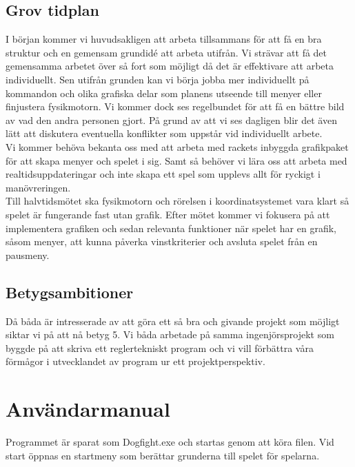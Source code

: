 \documentclass[12pt,a4paper]{article}
\begin{document}
\subsection{Grov tidplan}
I början kommer vi huvudsakligen att arbeta tillsammans för att få en bra struktur och en gemensam grundidé att arbeta utifrån. Vi strävar att få det gemensamma arbetet över så fort som möjligt då det är effektivare att arbeta individuellt. Sen utifrån grunden kan vi börja jobba mer individuellt på kommandon och olika grafiska delar som planens utseende till menyer eller finjustera fysikmotorn. Vi kommer dock ses regelbundet för att få en bättre bild av vad den andra personen gjort. På grund av att vi ses dagligen blir det även lätt att diskutera eventuella konflikter som uppstår vid individuellt arbete. \\

Vi kommer behöva bekanta oss med att arbeta med rackets inbyggda grafikpaket för att skapa menyer och spelet i sig. Samt så behöver vi lära oss att arbeta med realtidsuppdateringar och inte skapa ett spel som upplevs allt för ryckigt i manövreringen. \\

Till halvtidsmötet ska fysikmotorn och rörelsen i koordinatsystemet vara klart så spelet är fungerande fast utan grafik. Efter mötet kommer vi fokusera på att implementera grafiken och sedan relevanta funktioner när spelet har en grafik, såsom menyer, att kunna påverka vinstkriterier och avsluta spelet från en pausmeny.

\subsection{Betygsambitioner}
Då båda är intresserade av att göra ett så bra och givande projekt som möjligt siktar vi på att nå betyg 5. Vi båda arbetade på samma ingenjörsprojekt som byggde på att skriva ett reglertekniskt program och vi vill förbättra våra förmågor i utvecklandet av program ur ett projektperspektiv. 

\section{Användarmanual}\label{Användarmanual}
Programmet är sparat som Dogfight.exe och startas genom att köra filen. Vid start öppnas en startmeny som berättar grunderna till spelet för spelarna. \\
\end{document}

